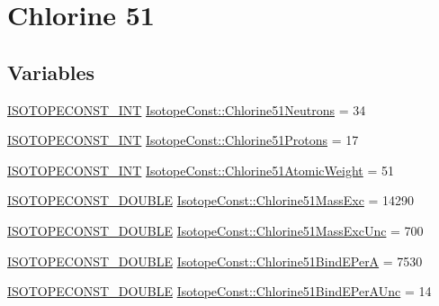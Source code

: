 \hypertarget{group___isotope_const-_chlorine-_cl51}{}\section{Chlorine 51}
\label{group___isotope_const-_chlorine-_cl51}
\subsection*{Variables}
\begin{DoxyCompactItemize}
\item 
\mbox{\hyperlink{group___isotope_const-_macros_ga5f18360b3e99483a35c32d789e62621c}{I\+S\+O\+T\+O\+P\+E\+C\+O\+N\+S\+T\+\_\+\+I\+NT}} \mbox{\hyperlink{group___isotope_const-_chlorine-_cl51_ga46e4950bf64eefd720efa42c31f3bb97}{Isotope\+Const\+::\+Chlorine51\+Neutrons}} = 34
\item 
\mbox{\hyperlink{group___isotope_const-_macros_ga5f18360b3e99483a35c32d789e62621c}{I\+S\+O\+T\+O\+P\+E\+C\+O\+N\+S\+T\+\_\+\+I\+NT}} \mbox{\hyperlink{group___isotope_const-_chlorine-_cl51_gaac00f585680af71742c8134117db0559}{Isotope\+Const\+::\+Chlorine51\+Protons}} = 17
\item 
\mbox{\hyperlink{group___isotope_const-_macros_ga5f18360b3e99483a35c32d789e62621c}{I\+S\+O\+T\+O\+P\+E\+C\+O\+N\+S\+T\+\_\+\+I\+NT}} \mbox{\hyperlink{group___isotope_const-_chlorine-_cl51_ga5ad60a5817db474b43ba7e249c217ad9}{Isotope\+Const\+::\+Chlorine51\+Atomic\+Weight}} = 51
\item 
\mbox{\hyperlink{group___isotope_const-_macros_ga8f45a7272ce02c0b4c65c44636ed719a}{I\+S\+O\+T\+O\+P\+E\+C\+O\+N\+S\+T\+\_\+\+D\+O\+U\+B\+LE}} \mbox{\hyperlink{group___isotope_const-_chlorine-_cl51_ga3e944455e8e4ed6335b387580598ba55}{Isotope\+Const\+::\+Chlorine51\+Mass\+Exc}} = 14290
\item 
\mbox{\hyperlink{group___isotope_const-_macros_ga8f45a7272ce02c0b4c65c44636ed719a}{I\+S\+O\+T\+O\+P\+E\+C\+O\+N\+S\+T\+\_\+\+D\+O\+U\+B\+LE}} \mbox{\hyperlink{group___isotope_const-_chlorine-_cl51_ga15401550a30c8d6da437aba8acefc149}{Isotope\+Const\+::\+Chlorine51\+Mass\+Exc\+Unc}} = 700
\item 
\mbox{\hyperlink{group___isotope_const-_macros_ga8f45a7272ce02c0b4c65c44636ed719a}{I\+S\+O\+T\+O\+P\+E\+C\+O\+N\+S\+T\+\_\+\+D\+O\+U\+B\+LE}} \mbox{\hyperlink{group___isotope_const-_chlorine-_cl51_gacf6ceba69a4e63163b411ea2418b0514}{Isotope\+Const\+::\+Chlorine51\+Bind\+E\+PerA}} = 7530
\item 
\mbox{\hyperlink{group___isotope_const-_macros_ga8f45a7272ce02c0b4c65c44636ed719a}{I\+S\+O\+T\+O\+P\+E\+C\+O\+N\+S\+T\+\_\+\+D\+O\+U\+B\+LE}} \mbox{\hyperlink{group___isotope_const-_chlorine-_cl51_gae726b340254beff22cb308269f2998e5}{Isotope\+Const\+::\+Chlorine51\+Bind\+E\+Per\+A\+Unc}} = 14

\end{DoxyCompactItemize}
